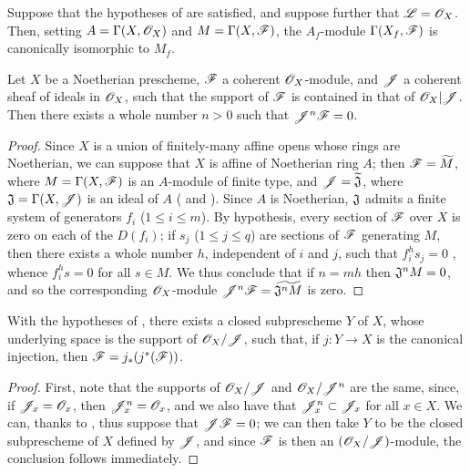 \begin{cor}[9.3.3]
\label{1.9.3.3}
Suppose that the hypotheses of  are satisfied, and suppose further that
$\mathscr{L}=\mathscr{O}_X$. Then, setting $A=\Gamma(X,\mathscr{O}_X)$ and $M=\Gamma(X,\mathscr{F})$, the $A_f$-module
$\Gamma(X_f,\mathscr{F})$ is canonically isomorphic to $M_f$.
\end{cor}

\begin{prop}[9.3.4]
\label{1.9.3.4}
Let $X$ be a Noetherian prescheme, $\mathscr{F}$ a coherent $\mathscr{O}_X$-module, and $\mathscr{J}$ a
coherent sheaf of ideals in $\mathscr{O}_X$, such that the support of $\mathscr{F}$ is contained in that
of $\mathscr{O}_X|\mathscr{J}$. Then there exists a whole number $n>0$ such that $\mathscr{J}^n\mathscr{F}=0$.
\end{prop}

\begin{proof}
\label{proof-1.9.3.4}
Since $X$ is a union of finitely-many affine opens whose rings are Noetherian, we can suppose
that $X$ is affine of Noetherian ring $A$; then $\mathscr{F}={\widetilde{M}}$, where
$M=\Gamma(X,\mathscr{F})$ is an $A$-module of finite type, and $\mathscr{J}={\widetilde{\mathfrak{J}}}$,
where $\mathfrak{J}=\Gamma(X,\mathscr{J})$ is an ideal of $A$ ( and
). Since $A$ is Noetherian, $\mathfrak{J}$ admits a finite system of
generators $f_i$ ($1\leq i\leq m$). By hypothesis, every section of $\mathscr{F}$ over
$X$ is zero on each of the $D(f_i)$; if $s_j$ ($1\leq j\leq q$) are sections of
$\mathscr{F}$ generating $M$, then there exists a whole number $h$, independent of $i$ and $j$,
such that $f_i^h s_j=0$ , whence $f_i^h s=0$ for all $s\in M$. We thus
conclude that if $n=mh$ then $\mathfrak{J}^n M=0$, and so the corresponding $\mathscr{O}_X$-module
$\mathscr{J}^n\mathscr{F}={\widetilde{\mathfrak{J}^n M}}$  is zero.
\end{proof}

\begin{cor}[9.3.5]
\label{1.9.3.5}
With the hypotheses of , there exists a closed subprescheme $Y$ of $X$,
whose underlying space is the support of $\mathscr{O}_X/\mathscr{J}$, such that, if $j:Y\to X$ is the
canonical injection, then $\mathscr{F}=j_*(j^*(\mathscr{F}))$.
\end{cor}

\begin{proof}
\label{proof-1.9.3.5}
First, note that the supports of $\mathscr{O}_X/\mathscr{J}$ and $\mathscr{O}_X/\mathscr{J}^n$ are the same,
since, if $\mathscr{J}_x=\mathscr{O}_x$, then $\mathscr{J}_x^n=\mathscr{O}_x$, and we also have that
$\mathscr{J}_x^n\subset\mathscr{J}_x$ for all $x\in X$. We can, thanks to , thus
suppose that $\mathscr{J}\mathscr{F}=0$; we can then take $Y$ to be the closed subprescheme of $X$
defined by $\mathscr{J}$, and since $\mathscr{F}$ is then an $(\mathscr{O}_X/\mathscr{J})$-module, the conclusion
follows immediately.
\end{proof}

